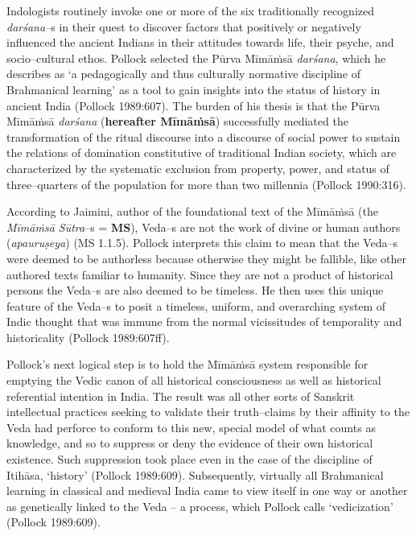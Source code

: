 Indologists routinely invoke one or more of the six traditionally recognized \textit{darśana–}s in their quest to discover factors that positively or negatively influenced the ancient Indians in their attitudes towards life, their psyche, and socio–cultural ethos. Pollock selected the Pūrva Mīmāṁsā \textit{darśana}, which he describes as ‘a pedagogically and thus culturally normative discipline of Brahmanical learning’ as a tool to gain insights into the status of history in ancient India (Pollock 1989:607). The burden of his thesis is that the Pūrva Mīmāṁsā \textit{darśana} (\textbf{hereafter Mīmāṁsā}) successfully mediated the transformation of the ritual discourse into a discourse of social power to sustain the relations of domination constitutive of traditional Indian society, which are characterized by the systematic exclusion from property, power, and status of three–quarters of the population for more than two millennia (Pollock 1990:316).

According to Jaimini, author of the foundational text of the Mīmāṁsā (the \textit{Mīmāṁsā Sūtra}–s = \textbf{MS}), Veda–s are not the work of divine or human authors (\textit{apauruṣeya}) (MS 1.1.5). Pollock interprets this claim to mean that the Veda–s were deemed to be authorless because otherwise they might be fallible, like other authored texts familiar to humanity. Since they are not a product of historical persons the Veda–s are also deemed to be timeless. He then uses this unique feature of the Veda–s to posit a timeless, uniform, and overarching system of Indic thought that was immune from the normal vicissitudes of temporality and historicality (Pollock 1989:607ff).

Pollock’s next logical step is to hold the Mīmāṁsā system responsible for emptying the Vedic canon of all historical consciousness as well as historical referential intention in India. The result was all other sorts of Sanskrit intellectual practices seeking to validate their truth–claims by their affinity to the Veda had perforce to conform to this new, special model of what counts as knowledge, and so to suppress or deny the evidence of their own historical existence. Such suppression took place even in the case of the discipline of Itihāsa, ‘history’ (Pollock 1989:609). Subsequently, virtually all Brahmanical learning in classical and medieval India came to view itself in one way or another as genetically linked to the Veda – a process, which Pollock calls ‘vedicization’ (Pollock 1989:609).

